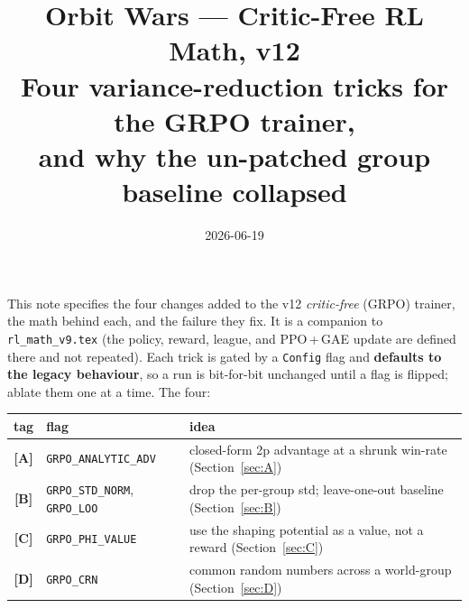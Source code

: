 \documentclass[11pt]{article}
\title{\textbf{Orbit Wars --- Critic-Free RL Math, v12\\[2pt]
\large Four variance-reduction tricks for the GRPO trainer,\\
and why the un-patched group baseline collapsed}}
\author{}
\date{2026-06-19}
\newcommand{\cd}[1]{\texttt{#1}}
\begin{document}
\maketitle

\begin{center}\small
This note specifies the four changes added to the v12 \emph{critic-free} (GRPO) trainer, the math
behind each, and the failure they fix. It is a companion to \cd{rl\_math\_v9.tex} (the policy,
reward, league, and PPO\,+\,GAE update are defined there and not repeated). Each trick is gated by
a \cd{Config} flag and \textbf{defaults to the legacy behaviour}, so a run is bit-for-bit unchanged
until a flag is flipped; ablate them one at a time. The four:
\begin{center}\small
\begin{tabular}{@{}cll@{}}
\toprule
tag & flag & idea \\
\midrule
\textbf{[A]} & \cd{GRPO\_ANALYTIC\_ADV} & closed-form 2p advantage at a shrunk win-rate (Section~\ref{sec:A}) \\
\textbf{[B]} & \cd{GRPO\_STD\_NORM}, \cd{GRPO\_LOO} & drop the per-group std; leave-one-out baseline (Section~\ref{sec:B}) \\
\textbf{[C]} & \cd{GRPO\_PHI\_VALUE} & use the shaping potential as a value, not a reward (Section~\ref{sec:C}) \\
\textbf{[D]} & \cd{GRPO\_CRN} & common random numbers across a world-group (Section~\ref{sec:D}) \\
\bottomrule
\end{tabular}
\end{center}
\end{center}
\tableofcontents
\bigskip

\end{document}
